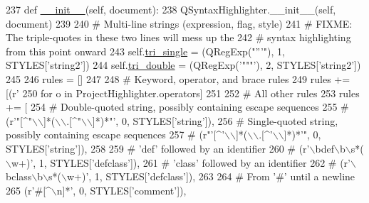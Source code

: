 \begin{DoxyCode}
237     \textcolor{keyword}{def }\hyperlink{classsoftware_1_1chipwhisperer_1_1common_1_1ui_1_1ProjectTextEditor_1_1ProjectHighlighter_a0be841ea2ac7e1b7e785a2bb5a816b88}{\_\_init\_\_}(self, document):
238         QSyntaxHighlighter.\_\_init\_\_(self, document)
239 
240         \textcolor{comment}{# Multi-line strings (expression, flag, style)}
241         \textcolor{comment}{# FIXME: The triple-quotes in these two lines will mess up the}
242         \textcolor{comment}{# syntax highlighting from this point onward}
243         self.\hyperlink{classsoftware_1_1chipwhisperer_1_1common_1_1ui_1_1ProjectTextEditor_1_1ProjectHighlighter_a7f3079f9c00c29c35f090685a2ed7cf4}{tri\_single} = (QRegExp(\textcolor{stringliteral}{"'''"}), 1, STYLES[\textcolor{stringliteral}{'string2'}])
244         self.\hyperlink{classsoftware_1_1chipwhisperer_1_1common_1_1ui_1_1ProjectTextEditor_1_1ProjectHighlighter_a58d6253ebc44e23d7daa65b28e35ca69}{tri\_double} = (QRegExp(\textcolor{stringliteral}{'"""'}), 2, STYLES[\textcolor{stringliteral}{'string2'}])
245 
246         rules = []
247 
248         \textcolor{comment}{# Keyword, operator, and brace rules}
249         rules += [(\textcolor{stringliteral}{r'%
250             \textcolor{keywordflow}{for} o \textcolor{keywordflow}{in} ProjectHighlighter.operators]
251 
252         \textcolor{comment}{# All other rules}
253         rules += [
254             \textcolor{comment}{# Double-quoted string, possibly containing escape sequences}
255             \textcolor{comment}{# (r'"[^"\(\backslash\)\(\backslash\)]*(\(\backslash\)\(\backslash\).[^"\(\backslash\)\(\backslash\)]*)*"', 0, STYLES['string']),}
256             \textcolor{comment}{# Single-quoted string, possibly containing escape sequences}
257             \textcolor{comment}{# (r"'[^'\(\backslash\)\(\backslash\)]*(\(\backslash\)\(\backslash\).[^'\(\backslash\)\(\backslash\)]*)*'", 0, STYLES['string']),}
258 
259             \textcolor{comment}{# 'def' followed by an identifier}
260             \textcolor{comment}{# (r'\(\backslash\)bdef\(\backslash\)b\(\backslash\)s*(\(\backslash\)w+)', 1, STYLES['defclass']),}
261             \textcolor{comment}{# 'class' followed by an identifier}
262             \textcolor{comment}{# (r'\(\backslash\)bclass\(\backslash\)b\(\backslash\)s*(\(\backslash\)w+)', 1, STYLES['defclass']),}
263 
264             \textcolor{comment}{# From '#' until a newline}
265             (\textcolor{stringliteral}{r'#[^\(\backslash\)n]*'}, 0, STYLES[\textcolor{stringliteral}{'comment'}]),
}
\end{DoxyCode}
